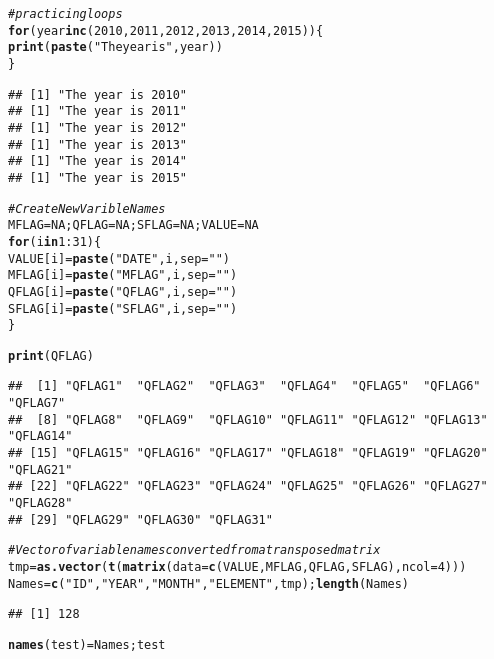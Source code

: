 \documentclass{article}\usepackage[]{graphicx}\usepackage[]{color}
\makeatletter
\newcommand{\hlnum}[1]{\textcolor[rgb]{0.686,0.059,0.569}{#1}}%
\newcommand{\hlstr}[1]{\textcolor[rgb]{0.192,0.494,0.8}{#1}}%
\newcommand{\hlcom}[1]{\textcolor[rgb]{0.678,0.584,0.686}{\textit{#1}}}%
\newcommand{\hlopt}[1]{\textcolor[rgb]{0,0,0}{#1}}%
\newcommand{\hlstd}[1]{\textcolor[rgb]{0.345,0.345,0.345}{#1}}%
\newcommand{\hlkwa}[1]{\textcolor[rgb]{0.161,0.373,0.58}{\textbf{#1}}}%
\newcommand{\hlkwb}[1]{\textcolor[rgb]{0.69,0.353,0.396}{#1}}%
\newcommand{\hlkwc}[1]{\textcolor[rgb]{0.333,0.667,0.333}{#1}}%
\newcommand{\hlkwd}[1]{\textcolor[rgb]{0.737,0.353,0.396}{\textbf{#1}}}%
\newenvironment{kframe}{%
 \def\at@end@of@kframe{}%
 \ifinner\ifhmode%
  \def\at@end@of@kframe{\end{minipage}}%
  \begin{minipage}{\columnwidth}%
 \fi\fi%
 \def\FrameCommand##1{\hskip\@totalleftmargin \hskip-\fboxsep
 \colorbox{shadecolor}{##1}\hskip-\fboxsep
     \hskip-\linewidth \hskip-\@totalleftmargin \hskip\columnwidth}%
 \MakeFramed {\advance\hsize-\width
   \@totalleftmargin\z@ \linewidth\hsize
   \@setminipage}}%
 {\par\unskip\endMakeFramed%
 \at@end@of@kframe}
\newenvironment{knitrout}{}{} %
\makeatother
\begin{document}
\begin{knitrout}
\color{fgcolor}\begin{kframe}
\begin{alltt}
\hlcom{# practicing loops}
\hlkwa{for} \hlstd{(year} \hlkwa{in} \hlkwd{c}\hlstd{(}\hlnum{2010}\hlstd{,}\hlnum{2011}\hlstd{,}\hlnum{2012}\hlstd{,}\hlnum{2013}\hlstd{,}\hlnum{2014}\hlstd{,}\hlnum{2015}\hlstd{))\{}
  \hlkwd{print}\hlstd{(}\hlkwd{paste}\hlstd{(}\hlstr{"The year is"}\hlstd{, year))}
\hlstd{\}}
\end{alltt}
\begin{verbatim}
## [1] "The year is 2010"
## [1] "The year is 2011"
## [1] "The year is 2012"
## [1] "The year is 2013"
## [1] "The year is 2014"
## [1] "The year is 2015"
\end{verbatim}
\begin{alltt}
\hlcom{# Create New Varible Names}
\hlstd{MFLAG}\hlkwb{=}\hlnum{NA}\hlstd{; QFLAG}\hlkwb{=}\hlnum{NA}\hlstd{; SFLAG}\hlkwb{=}\hlnum{NA}\hlstd{; VALUE}\hlkwb{=}\hlnum{NA}
\hlkwa{for} \hlstd{(i} \hlkwa{in} \hlnum{1}\hlopt{:}\hlnum{31}\hlstd{)\{}
\hlstd{VALUE[i]} \hlkwb{=} \hlkwd{paste}\hlstd{(}\hlstr{"DATE"}\hlstd{, i,} \hlkwc{sep}\hlstd{=}\hlstr{""}\hlstd{)}
\hlstd{MFLAG[i]} \hlkwb{=} \hlkwd{paste}\hlstd{(}\hlstr{"MFLAG"}\hlstd{, i,} \hlkwc{sep}\hlstd{=}\hlstr{""}\hlstd{)}
\hlstd{QFLAG[i]} \hlkwb{=} \hlkwd{paste}\hlstd{(}\hlstr{"QFLAG"}\hlstd{, i,} \hlkwc{sep}\hlstd{=}\hlstr{""}\hlstd{)}
\hlstd{SFLAG[i]} \hlkwb{=} \hlkwd{paste}\hlstd{(}\hlstr{"SFLAG"}\hlstd{, i,} \hlkwc{sep}\hlstd{=}\hlstr{""}\hlstd{)}
\hlstd{\}}

\hlkwd{print}\hlstd{(QFLAG)}
\end{alltt}
\begin{verbatim}
##  [1] "QFLAG1"  "QFLAG2"  "QFLAG3"  "QFLAG4"  "QFLAG5"  "QFLAG6"  "QFLAG7" 
##  [8] "QFLAG8"  "QFLAG9"  "QFLAG10" "QFLAG11" "QFLAG12" "QFLAG13" "QFLAG14"
## [15] "QFLAG15" "QFLAG16" "QFLAG17" "QFLAG18" "QFLAG19" "QFLAG20" "QFLAG21"
## [22] "QFLAG22" "QFLAG23" "QFLAG24" "QFLAG25" "QFLAG26" "QFLAG27" "QFLAG28"
## [29] "QFLAG29" "QFLAG30" "QFLAG31"
\end{verbatim}
\begin{alltt}
\hlcom{# Vector of variable names converted from a transposed matrix}
\hlstd{tmp} \hlkwb{=} \hlkwd{as.vector}\hlstd{(}\hlkwd{t}\hlstd{(}\hlkwd{matrix}\hlstd{(}\hlkwc{data}\hlstd{=}\hlkwd{c}\hlstd{(VALUE, MFLAG, QFLAG, SFLAG),} \hlkwc{ncol}\hlstd{=}\hlnum{4}\hlstd{)))}
\hlstd{Names} \hlkwb{=} \hlkwd{c}\hlstd{(}\hlstr{"ID"}\hlstd{,} \hlstr{"YEAR"}\hlstd{,} \hlstr{"MONTH"}\hlstd{,} \hlstr{"ELEMENT"}\hlstd{, tmp);} \hlkwd{length}\hlstd{(Names)}
\end{alltt}
\begin{verbatim}
## [1] 128
\end{verbatim}
\begin{alltt}
\hlkwd{names}\hlstd{(test)}\hlkwb{=} \hlstd{Names; test}
\end{alltt}



\end{kframe}
\end{knitrout}
\end{document}
